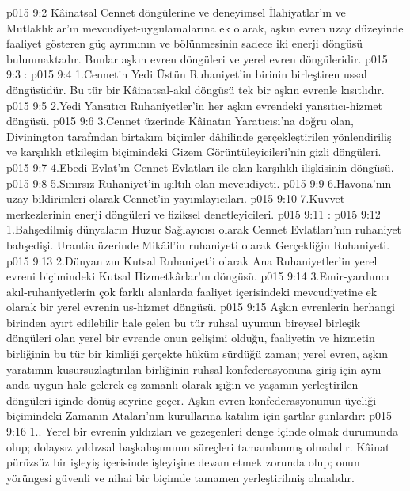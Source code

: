 \vs p015 9:2 Kâinatsal Cennet döngülerine ve deneyimsel İlahiyatlar’ın ve Mutlaklıklar’ın mevcudiyet\hyp{}uygulamalarına ek olarak, aşkın evren uzay düzeyinde faaliyet gösteren güç ayrımının ve bölünmesinin sadece iki enerji döngüsü bulunmaktadır. Bunlar aşkın evren döngüleri ve yerel evren döngüleridir.
\vs p015 9:3 :
\vs p015 9:4 1.\bibnobreakspace Cennetin Yedi Üstün Ruhaniyet’in birinin birleştiren ussal döngüsüdür. Bu tür bir Kâinatsal\hyp{}akıl döngüsü tek bir aşkın evrenle kısıtlıdır.
\vs p015 9:5 2.\bibnobreakspace Yedi Yansıtıcı Ruhaniyetler’in her aşkın evrendeki yansıtıcı\hyp{}hizmet döngüsü.
\vs p015 9:6 3.\bibnobreakspace Cennet üzerinde Kâinatın Yaratıcısı’na doğru olan, Divinington tarafından birtakım biçimler dâhilinde gerçekleştirilen yönlendiriliş ve karşılıklı etkileşim biçimindeki Gizem Görüntüleyicileri’nin gizli döngüleri.
\vs p015 9:7 4.\bibnobreakspace Ebedi Evlat’ın Cennet Evlatları ile olan karşılıklı ilişkisinin döngüsü.
\vs p015 9:8 5.\bibnobreakspace Sınırsız Ruhaniyet’in ışıltılı olan mevcudiyeti.
\vs p015 9:9 6.\bibnobreakspace Havona’nın uzay bildirimleri olarak Cennet’in yayımlayıcıları.
\vs p015 9:10 7.\bibnobreakspace Kuvvet merkezlerinin enerji döngüleri ve fiziksel denetleyicileri.
\vs p015 9:11 :
\vs p015 9:12 1.\bibnobreakspace Bahşedilmiş dünyaların Huzur Sağlayıcısı olarak Cennet Evlatları’nın ruhaniyet bahşedişi. Urantia üzerinde Mikâil’in ruhaniyeti olarak Gerçekliğin Ruhaniyeti.
\vs p015 9:13 2.\bibnobreakspace Dünyanızın Kutsal Ruhaniyet’i olarak Ana Ruhaniyetler’in yerel evreni biçimindeki Kutsal Hizmetkârlar’ın döngüsü.
\vs p015 9:14 3.\bibnobreakspace Emir\hyp{}yardımcı akıl\hyp{}ruhaniyetlerin çok farklı alanlarda faaliyet içerisindeki mevcudiyetine ek olarak bir yerel evrenin us\hyp{}hizmet döngüsü.
\vs p015 9:15 Aşkın evrenlerin herhangi birinden ayırt edilebilir hale gelen bu tür ruhsal uyumun bireysel birleşik döngüleri olan yerel bir evrende onun gelişimi olduğu, faaliyetin ve hizmetin birliğinin bu tür bir kimliği gerçekte hüküm sürdüğü zaman; yerel evren, aşkın yaratımın kusursuzlaştırılan birliğinin ruhsal konfederasyonuna giriş için aynı anda uygun hale gelerek eş zamanlı olarak ışığın ve yaşamın yerleştirilen döngüleri içinde dönüş seyrine geçer. Aşkın evren konfederasyonunun üyeliği biçimindeki Zamanın Ataları’nın kurullarına katılım için şartlar şunlardır:
\vs p015 9:16 1.\bibnobreakspace {}. Yerel bir evrenin yıldızları ve gezegenleri denge içinde olmak durumunda olup; dolaysız yıldızsal başkalaşımının süreçleri tamamlanmış olmalıdır. Kâinat pürüzsüz bir işleyiş içerisinde işleyişine devam etmek zorunda olup; onun yörüngesi güvenli ve nihai bir biçimde tamamen yerleştirilmiş olmalıdır.
